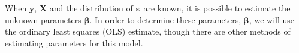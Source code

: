When $\textbf{y}$, $\textbf{X}$ and the distribution of $\boldsymbol{\varepsilon}$ are known, it is possible to estimate the unknown parameters $\boldsymbol{\beta}$. 
In order to determine these parameters, $\boldsymbol{\beta}$, we will use the ordinary least squares (OLS) estimate, though there are other methods of estimating parameters for this model.